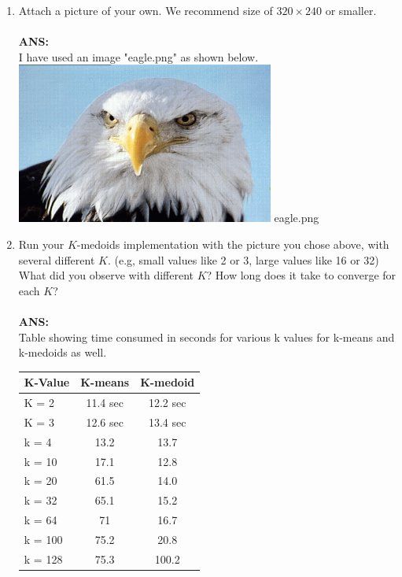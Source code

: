 \documentclass[twoside,10pt]{article}
\begin{document}
\begin{enumerate}
  \item Attach a picture of your own. We recommend size of $320 \times 240$ or smaller.\\
  \\
  \textbf{ANS:}\\
  I have used an image "eagle.png" as shown below.\\
\includegraphics[width=\textwidth,height=\textheight,keepaspectratio]{eagle.png}
  eagle.png\\
  \item Run your $K$-medoids implementation with the picture you chose above, with several different $K$. (e.g, small values like 2 or 3, large values like 16 or 32) What did you observe with different $K$? How long does it take to converge for each $K$?\\
\\
\textbf{ANS:}\\
Table showing time consumed in seconds for various k values for k-means and k-medoids as well.
  \begin{table}[!h]
\centering \small
\begin{tabular}{l|c|c}
  \hline
  K-Value & K-means & K-medoid\\
  \hline \hline
  K = 2 & 11.4 sec & 12.2 sec\\
  K = 3 & 12.6 sec & 13.4 sec\\
  k = 4 & 13.2 & 13.7\\
  k = 10 & 17.1 & 12.8\\
  k = 20 & 61.5 & 14.0\\
  k = 32 & 65.1 & 15.2\\
  k = 64 & 71 & 16.7\\
  k = 100 & 75.2 & 20.8\\
  k = 128 & 75.3 & 100.2\\

\end{tabular}
\end{table}
\end{enumerate}
\end{document}
